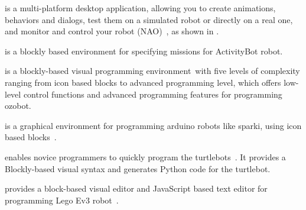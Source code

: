 \parhead{\choregraphe} is a multi-platform desktop application, allowing you to create animations, behaviors and dialogs, test them on a simulated robot or directly on a real one, and monitor and control your robot (NAO)~\cite{choregraphe,Monceaux2009,Miskam2014}, %
as shown in .

\parhead{\blocklyprop} is a blockly based environment for specifying missions for ActivityBot robot\cite{Parallax}. %

\parhead{\ozoblockly} is a blockly-based visual programming environment\,\cite{ozobot} with five levels of complexity ranging from icon based blocks to advanced programming level, which offers low-level control functions and advanced programming features for programming ozobot.%
 
\parhead{\minibloq} is a graphical environment for programming arduino robots like sparki, using icon based blocks~\cite{miniBloq}. %
  
\parhead{\turtlebot} enables novice programmers to quickly program the turtlebots~\cite{turtlebot3blockly}. %
It provides a Blockly-based visual syntax and generates Python code for the turtlebot. %
 
\parhead{\makecode} provides a block-based visual editor and JavaScript based text editor for programming Lego Ev3 robot~\cite{makecode}. %
 
